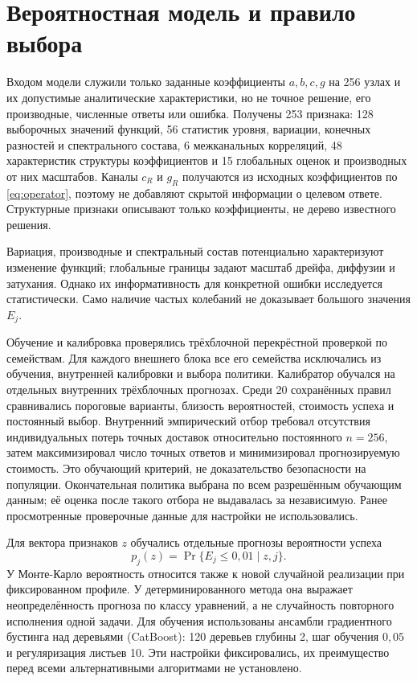\section{Вероятностная модель и правило выбора}
Входом модели служили только заданные коэффициенты $a,b,c,g$ на 256 узлах и их допустимые аналитические характеристики, но не точное решение, его производные, численные ответы или ошибка. Получены 253 признака: 128 выборочных значений функций, 56 статистик уровня, вариации, конечных разностей и спектрального состава, 6 межканальных корреляций, 48 характеристик структуры коэффициентов и 15 глобальных оценок и производных от них масштабов. Каналы $c_R$ и $g_R$ получаются из исходных коэффициентов по \eqref{eq:operator}, поэтому не добавляют скрытой информации о целевом ответе. Структурные признаки описывают только коэффициенты, не дерево известного решения.

Вариация, производные и спектральный состав потенциально характеризуют изменение функций; глобальные границы задают масштаб дрейфа, диффузии и затухания. Однако их информативность для конкретной ошибки исследуется статистически. Само наличие частых колебаний не доказывает большого значения $E_j$.


Обучение и калибровка проверялись трёхблочной перекрёстной проверкой по семействам. Для каждого внешнего блока все его семейства исключались из обучения, внутренней калибровки и выбора политики. Калибратор обучался на отдельных внутренних трёхблочных прогнозах. Среди 20 сохранённых правил сравнивались пороговые варианты, близость вероятностей, стоимость успеха и постоянный выбор. Внутренний эмпирический отбор требовал отсутствия индивидуальных потерь точных доставок относительно постоянного $n=256$, затем максимизировал число точных ответов и минимизировал прогнозируемую стоимость. Это обучающий критерий, не доказательство безопасности на популяции. Окончательная политика выбрана по всем разрешённым обучающим данным; её оценка после такого отбора не выдавалась за независимую. Ранее просмотренные проверочные данные для настройки не использовались.

\clearpage
Для вектора признаков $z$ обучались отдельные прогнозы вероятности успеха
\begin{equation}\label{eq:probability}
p_j(z)=\Pr\{E_j\le0{,}01\mid z,j\}.
\end{equation}
У Монте-Карло вероятность относится также к новой случайной реализации при фиксированном профиле. У детерминированного метода она выражает неопределённость прогноза по классу уравнений, а не случайность повторного исполнения одной задачи. Для обучения использованы ансамбли градиентного бустинга над деревьями (CatBoost): 120 деревьев глубины 2, шаг обучения $0{,}05$ и регуляризация листьев 10. Эти настройки фиксировались, их преимущество перед всеми альтернативными алгоритмами не установлено.

